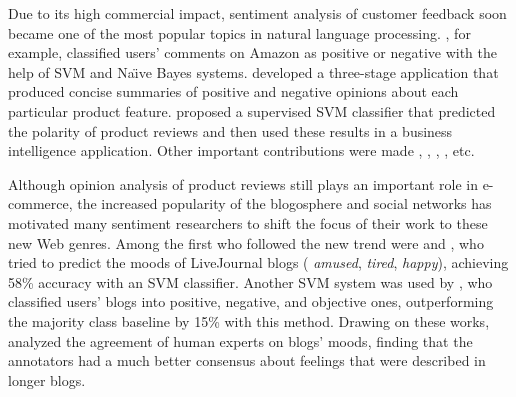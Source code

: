 
Due to its high commercial impact, sentiment analysis of customer
feedback soon became one of the most popular topics in natural
language processing.  \citet{Dave:03}, for example, classified users'
comments on Amazon as positive or negative with the help of SVM and
Na\"{\i}ve Bayes systems.  \citet{Hu:04} developed a three-stage
application that produced concise summaries of positive and negative
opinions about each particular product feature.  \citet{Funk:08}
proposed a supervised SVM classifier that predicted the polarity of
product reviews and then used these results in a business intelligence
application.  Other important contributions were made
\citet{Popescu:05}, \citet{Ding:09}, \citet{Wei:10},
\citet{Mukherjee:12}, etc.


Although opinion analysis of product reviews still plays an important
role in e-commerce, the increased popularity of the blogosphere and
social networks has motivated many sentiment researchers to shift the
focus of their work to these new Web genres.  Among the first who
followed the new trend were \citet{Mishne:05} and \citet{Mishne:07},
who tried to predict the moods of LiveJournal blogs (\eg{}
\emph{amused}, \emph{tired}, \emph{happy}), achieving 58\% accuracy
with an SVM classifier.
Another SVM system was used by \citet{Chesley:06}, who classified
users' blogs into positive, negative, and objective ones,
outperforming the majority class baseline by 15\% with this method.
Drawing on these works, \citet{Gill:08} analyzed the agreement of
human experts on blogs' moods, finding that the annotators had a much
better consensus about feelings that were described in longer blogs.


